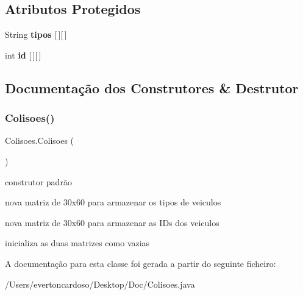 \subsection*{Atributos Protegidos}
\begin{DoxyCompactItemize}
\item 
\mbox{\label{class_colisoes_a44a61dfac2eac26a202bc861c07b3b04}} 
String {\bfseries tipos} \mbox{[}$\,$\mbox{]}\mbox{[}$\,$\mbox{]}
\item 
\mbox{\label{class_colisoes_a24e82ed4cd735cdf7adc0e1dfe1da0d4}} 
int {\bfseries id} \mbox{[}$\,$\mbox{]}\mbox{[}$\,$\mbox{]}
\end{DoxyCompactItemize}


\subsection{Documentação dos Construtores \& Destrutor}
\mbox{\label{class_colisoes_a8a51b610e7e5d3a011b5c790429dc598}} 
\subsubsection{\texorpdfstring{Colisoes()}{Colisoes()}}
{\footnotesize\ttfamily Colisoes.\+Colisoes (\begin{DoxyParamCaption}{ }\end{DoxyParamCaption})}



construtor padrão 

nova matriz de 30x60 para armazenar os tipos de veiculos

nova matriz de 30x60 para armazenar as I\+Ds dos veiculos

inicializa as duas matrizes como vazias 

A documentação para esta classe foi gerada a partir do seguinte ficheiro\+:\begin{DoxyCompactItemize}
\item 
/\+Users/evertoncardoso/\+Desktop/\+Doc/Colisoes.\+java\end{DoxyCompactItemize}
